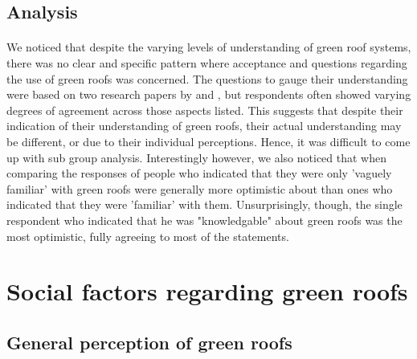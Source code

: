 \documentclass{article}
\begin{document}
\begin{multicols}{2}
  \subsection{Analysis}
  \paragraph{} We noticed that despite the varying levels of understanding
  of green roof systems, there was no clear and specific pattern
  where acceptance and questions regarding the use of green roofs was
  concerned. The questions to gauge their understanding were based on
  two research papers by \cite{HKGreenRoofGL} and \cite{energeff},
  but respondents often showed varying degrees of agreement across
  those aspects listed. This suggests that despite their indication of
  their understanding of green roofs, their actual understanding may
  be different, or due to their individual perceptions. Hence, it was
  difficult to come up with sub group analysis.  Interestingly however, we
  also noticed that when comparing the responses of people who indicated
  that they were only 'vaguely familiar' with green roofs were generally
  more optimistic about than ones who indicated that they were 'familiar'
  with them. Unsurprisingly, though, the single respondent who indicated
  that he was "knowledgable" about green roofs was the most optimistic,
  fully agreeing to most of the statements.



  \section{Social factors regarding green roofs}
  \subsection{General perception of green roofs}

\end{multicols}
\end{document}
